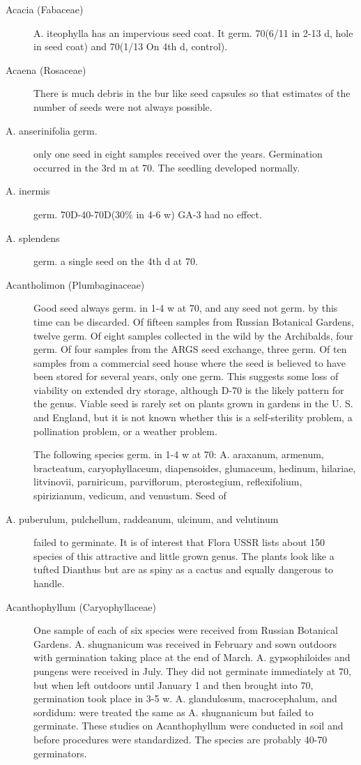 \begin{description}
\item[Acacia (Fabaceae)] A. iteophylla has an impervious seed coat. It germ.
70(6/11 in 2-13 d, hole in seed coat) and 70(1/13 On 4th d, control).
\item[Acaena (Rosaceae)] There is much debris in the bur like seed capsules so
that estimates of the number of seeds were not always possible.
\item[A. anserinifolia germ.] only one seed in eight samples received over the years.
Germination occurred in the 3rd m at 70. The seedling developed normally.
\item[A. inermis] germ. 70D-40-70D(30\% in 4-6 w) GA-3 had no effect.
\item[A. splendens] germ. a single seed on the 4th d at 70.
\item[Acantholimon (Plumbaginaceae)] Good seed always germ. in 1-4 w at 70,
and any seed not germ. by this time can be discarded. Of fifteen samples from
Russian Botanical Gardens, twelve germ. Of eight samples collected in the wild by the
Archibalds, four germ. Of four samples from the ARGS seed exchange, three germ. Of
ten samples from a commercial seed house where the seed is believed to have been
stored for several years, only one germ. This suggests some loss of viability on
extended dry storage, although D-70 is the likely pattern for the genus. Viable seed is
rarely set on plants grown in gardens in the U. S. and England, but it is not known
whether this is a self-sterility problem, a pollination problem, or a weather problem.

The following species germ. in 1-4 w at 70: A. araxanum, armenum, bracteatum,
caryophyllaceum, diapensoides, glumaceum, hedinum, hilariae, litvinovii, parniricum,
parviflorum, pterostegium, reflexifolium, spirizianum, vedicum, and venustum. Seed of
\item[A. puberulum, pulchellum, raddeanum, ulcinum, and velutinum] failed to germinate. It
is of interest that Flora USSR lists about 150 species of this attractive and little grown
genus. The plants look like a tufted Dianthus but are as spiny as a cactus and equally
dangerous to handle.

\item[Acanthophyllum (Caryophyllaceae)] One sample of each of six species
were received from Russian Botanical Gardens. A. shugnanicum was received in
February and sown outdoors with germination taking place at the end of March. A.
gypsophiloides and pungens were received in July. They did not germinate
immediately at 70, but when left outdoors until January 1 and then brought into 70,
germination took place in 3-5 w. A. glandulosum, macrocephalum, and sordidum:
were treated the same as A. shugnanicum but failed to germinate. These studies on
Acanthophyllum were conducted in soil and before procedures were standardized.
The species are probably 40-70 germinators.


\end{description}
